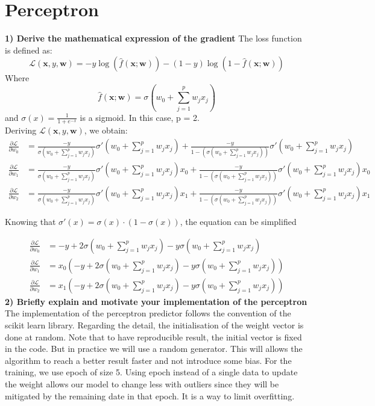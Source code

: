 \documentclass[acmconf,nonacm=true]{acmart}
\begin{document}
\section{Perceptron}
\textbf{1) Derive the mathematical expression of the gradient}
The loss function is defined as:
$$
\mathcal{L}(\mathbf{x}, y, \mathbf{w})=-y \log (\hat{f}(\mathbf{x} ; \mathbf{w}))-(1-y) \log (1-\hat{f}(\mathbf{x} ; \mathbf{w}))
$$
Where
$$\hat{f}(\mathbf{x} ; \mathbf{w}) = \sigma(w_0 + \sum^{p}_{j=1}w_j x_j)$$
and $\sigma(x) = \frac{1}{1+e^{-x}}$ is a sigmoid. In this case, p = 2.\\
Deriving $\mathcal{L}(\mathbf{x}, y, \mathbf{w})$, we obtain:
\begin{align}
    \frac{\partial \mathcal{L}}{\partial w_0} &= \frac{-y}{\sigma(w_0 + \sum^{p}_{j=1}w_j x_j)}\sigma'(w_0 + \sum^{p}_{j=1}w_j x_j) + \frac{-y}{1-(\sigma(w_0 + \sum^{p}_{j=1}w_j x_j))}\sigma'(w_0 + \sum^{p}_{j=1}w_j x_j)\\
    \frac{\partial \mathcal{L}}{\partial w_1} &=\frac{-y}{\sigma(w_0 + \sum^{p}_{j=1}w_j x_j)}\sigma'(w_0 + \sum^{p}_{j=1}w_j x_j) x_0+ \frac{-y}{1-(\sigma(w_0 + \sum^{p}_{j=1}w_j x_j))}\sigma'(w_0 + \sum^{p}_{j=1}w_j x_j) x_0\\ 
    \frac{\partial \mathcal{L}}{\partial w_2} &=\frac{-y}{\sigma(w_0 + \sum^{p}_{j=1}w_j x_j)}\sigma'(w_0 + \sum^{p}_{j=1}w_j x_j) x_1+ \frac{-y}{1-(\sigma(w_0 + \sum^{p}_{j=1}w_j x_j))}\sigma'(w_0 + \sum^{p}_{j=1}w_j x_j) x_1
\end{align}

Knowing that $\sigma'(x) = \sigma (x)\cdot (1-\sigma(x))$, the equation can be simplified

\begin{align}
    \frac{\partial \mathcal{L}}{\partial w_0} &= -y + 2\sigma(w_0 + \sum^{p}_{j=1}w_j x_j)-y\sigma(w_0 + \sum^{p}_{j=1}w_j x_j)\\
    \frac{\partial \mathcal{L}}{\partial w_1} &=x_0(-y + 2\sigma(w_0 + \sum^{p}_{j=1}w_j x_j)-y\sigma(w_0 + \sum^{p}_{j=1}w_j x_j))\\
    \frac{\partial \mathcal{L}}{\partial w_2} &=x_1(-y + 2\sigma(w_0 + \sum^{p}_{j=1}w_j x_j)-y\sigma(w_0 + \sum^{p}_{j=1}w_j x_j))
\end{align}
\textbf{2) Briefly explain and motivate your implementation of the perceptron}
The implementation of the perceptron predictor follows the convention of the scikit learn library. Regarding the detail, the initialisation of the weight vector is done at random. Note that to have reproducible result, the initial vector is fixed in the code. But in practice we will use a random generator. This will allows the algorithm to reach a better result faster and not introduce some bias. For the training, we use epoch of size 5. Using epoch instead of a single data to update the weight allows our model to change less with outliers since they will be mitigated by the remaining date in that epoch. It is a way to limit overfitting.
\end{document}
